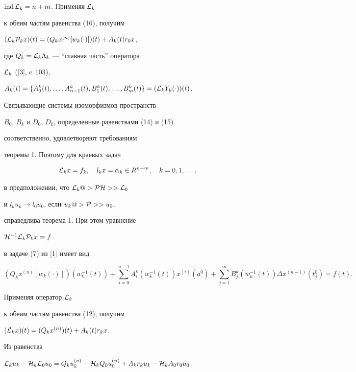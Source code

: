 $\operatorname{ind} {\cal L}_k = n+m$. Применяя ${\cal L}_k$


к обеим частям равенства (16), получим


$({\cal L}_k{\cal P}_kx)(t) = (Q_k x^{(n)}[w_k(\cdot)])(t) + A_k(t) r_0x$,


где $Q_k={\cal L}_k\Lambda_k$ --- ``главная часть'' оператора


${\cal L}_k$ ([3], c.\,103),


$A_k(t) = \{ A_0^k(t),\dotsc,A^k_{n-1}(t), B^k_1(t),\dotsc,B_m^k(t)\} =


({\cal L}_k Y_k(\cdot ))(t)$.





Связывающие системы изоморфизмов пространств


$B_0$, $B_k$ и $D_0$, $D_k$, определенные равенствами (14) и (15)


соответственно, удовлетворяют требованиям


теоремы 1. Поэтому для краевых задач


$$


{\cal L}_k x= f_k,\quad l_k x=\alpha_k\in R^{n+m},\quad k=0,1,\dotsc,


$$


в предположении, что ${\cal L}_k @>{{\cal P}{\cal H}}>> {\cal L}_0$


и $l_ku_k\to l_0u_0$, если $u_k@>{\cal P}>> u_0$,


справедлива теорема 1. При этом уравнение


${\cal H}^{-1} {\cal L}_k{\cal P}_kx=f$


в задаче (7) из [1] имеет вид


$$


(Q_kx^{(n)}[w_k(\cdot)])(w_k^{-1}(t)) +


\sum_{i=0}^{n-1} A_i^k(w_k^{-1}(t)) x^{(i)}(a^0)+


\sum_{j=1}^m B_j^k(w_k^{-1}(t))\Delta x^{(n-1)}(t_j^0) = f(t).


$$





Применяя оператор ${\cal L}_k$


к обеим частям равенства (12), получим


$({\cal L}_k x)(t) = (Q_kx^{(n)})(t) + A_k(t) r_kx$.


Из равенства


${\cal L}_k u_k - {\cal H}_k{\cal L}_0 u_0 =


Q_k u_k^{(n)}-{\cal H}_k Q_0 u_0^{(n)}+A_k r_k u_k-{\cal H}_k A_0 r_0 u_0$


